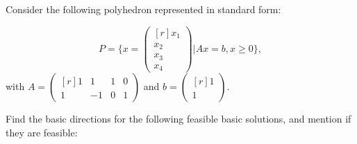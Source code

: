 
Consider the following polyhedron represented in standard form:

\begin{equation*}
    P = \Bigg\{ x = \begin{pmatrix*}[r] x_1 \\ x_2 \\ x_3 \\ x_4 \end{pmatrix*} | Ax = b, x\geq0 \Bigg\},
\end{equation*}
with $A = \begin{pmatrix*}[r] 1 & 1 & 1 & 0 \\ 1 & -1 & 0 & 1 \end{pmatrix*}$ and $b = \begin{pmatrix*}[r] 1 \\ 1 \end{pmatrix*}$.
\vspace{1em}

Find the basic directions for the following feasible basic solutions,
and mention if they are feasible:

